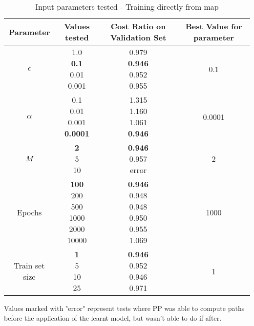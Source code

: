\begin{table}[!ht]
    \centering
    \caption{Input parameters tested - Training directly from map}
    \begin{tabular}{|c|c|c|c|}
        \hline
        Parameter & Values tested & Cost Ratio on Validation Set & Best Value for parameter\\
        \hline
        $\epsilon$ & \makecell{1.0 \\ \textbf{0.1} \\ 0.01 \\ 0.001} & \makecell{0.979 \\ \textbf{0.946} \\ 0.952 \\ 0.955} & 0.1 \\
        \hline
        $\alpha$ & \makecell{0.1 \\ 0.01 \\ 0.001 \\ \textbf{0.0001}} & \makecell{1.315 \\ 1.160 \\ 1.061 \\ \textbf{0.946}} & 0.0001 \\
        \hline
        $M$ & \makecell{\textbf{2} \\ 5 \\ 10} & \makecell{\textbf{0.946} \\ 0.957 \\ error} & 2 \\
        \hline
        Epochs & \makecell{\textbf{100} \\ 200 \\ 500 \\ 1000 \\ 2000 \\ 10000} & \makecell{\textbf{0.946} \\ 0.948 \\ 0.948 \\ 0.950 \\ 0.955 \\ 1.069} & 1000 \\
        \hline
        Train set size & \makecell{\textbf{1} \\ 5 \\ 10 \\ 25} & \makecell{\textbf{0.946} \\ 0.952 \\ 0.946 \\ 0.971} & 1 \\
        \hline
    \end{tabular}
    \label{tab:params-map}
\end{table}

Values marked with "error" represent tests where PP was able to compute paths before the application of the learnt model, but wasn't able to do if after.